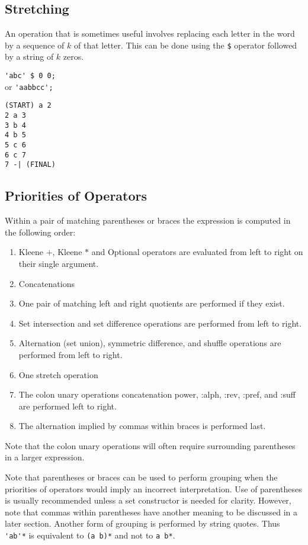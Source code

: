 \subsection{Stretching}
An operation that is sometimes useful involves replacing each letter in the
word by a sequence of $k$ of that letter.
This can be done using the \verb#$# operator followed by a string of $k$
zeros.
\begin{center}\begin{minipage}[t]{3in}\begin{minipage}[t]{3in}\begin{tabbing}
\qquad \= \verb#'abc' $ 0 0;#\\
or \> \verb#'aabbcc';#
\end{tabbing}\end{minipage}\end{minipage}
\begin{minipage}[t]{1.6in}\begin{verbatim}
(START) a 2
2 a 3
3 b 4
4 b 5
5 c 6
6 c 7
7 -| (FINAL)
\end{verbatim}\end{minipage}\end{center}

\subsection{Priorities of Operators}
Within a pair of matching parentheses or braces the expression is computed in
the following order:
\begin{enumerate}
\item Kleene $+$, Kleene $*$ and Optional operators are evaluated from left
to right on their single argument.
\item Concatenations
\item One pair of matching left and right quotients are performed if they
exist.
\item Set intersection and set difference operations are performed from
left to right.
\item Alternation (set union), symmetric difference, and shuffle operations
are performed from left to right.
\item One stretch operation
\item The colon unary operations concatenation power, :alph, :rev, :pref, and
:suff are performed left to right.
\item The alternation implied by commas within braces is performed last.
\end{enumerate}
Note that the colon unary operations will often require surrounding
parentheses in a larger expression.

Note that parentheses or braces can be used to perform grouping when the
priorities of operators would imply an incorrect interpretation.
Use of parentheses is usually recommended unless a set constructor is
needed for clarity.
However, note that commas within parentheses have another meaning to be
discussed in a later section.
Another form of grouping is performed by string quotes.
Thus \verb#'ab'*# is equivalent to \verb#(a b)*# and not to
\verb#a b*#.
